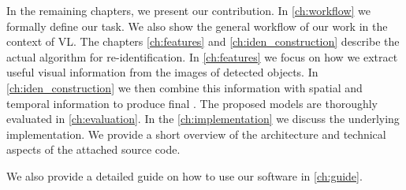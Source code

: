 In the remaining chapters, we present our contribution. In \autoref{ch:workflow} we formally define our task. We also show the general workflow of our work in the context of \gls{VL}. The chapters \ref{ch:features} and \ref{ch:iden_construction} describe the actual algorithm for re-identification. In \autoref{ch:features} we focus on how we extract useful visual information from the images of detected objects. In \autoref{ch:iden_construction} we then combine this information with spatial and temporal information to produce final \reid{}. The proposed models are thoroughly evaluated in \autoref{ch:evaluation}. In the \autoref{ch:implementation} we discuss the underlying implementation. We provide a short overview of the architecture and technical aspects of the attached source code.

We also provide a detailed guide on how to use our software in \autoref{ch:guide}.